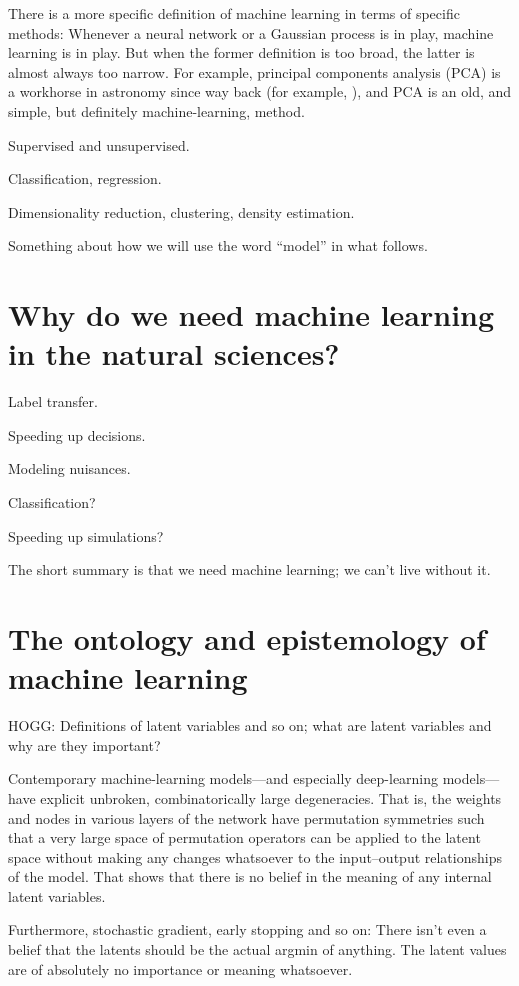 \documentclass[11pt]{article}
\begin{document}
There is a more specific definition of machine learning in terms of specific methods:
Whenever a neural network or a Gaussian process is in play, machine learning is in play.
But when the former definition is too broad, the latter is almost always too narrow.
For example, principal components analysis (PCA) is a workhorse in astronomy since way back (for example, \cite{pcaredshift}), and PCA is an old, and simple, but definitely machine-learning, method.

Supervised and unsupervised.

Classification, regression.

Dimensionality reduction, clustering, density estimation.

Something about how we will use the word ``model'' in what follows.

\section{Why do we need machine learning in the natural sciences?}

Label transfer.

Speeding up decisions.

Modeling nuisances.

Classification?

Speeding up simulations?

The short summary is that we need machine learning; we can't live without it.

\section{The ontology and epistemology of machine learning}

HOGG: Definitions of latent variables and so on; what are latent variables and why are they important?

Contemporary machine-learning models---and especially deep-learning models---have explicit unbroken, combinatorically large degeneracies.
That is, the weights and nodes in various layers of the network have permutation symmetries such that a very large space of permutation operators can be applied to the latent space without making any changes whatsoever to the input--output relationships of the model.
That shows that there is no belief in the meaning of any internal latent variables.

Furthermore, stochastic gradient, early stopping and so on:
There isn't even a belief that the latents should be the actual argmin of anything.
The latent values are of absolutely no importance or meaning whatsoever.
\end{document}
